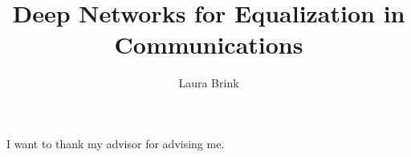 \documentclass[masters]{ucbthesis}
\begin{document}

\title{Deep Networks for Equalization in Communications}
\author{Laura Brink}




\maketitle
\approvalpage
\copyrightpage



\begin{frontmatter}


\tableofcontents
\clearpage
\listoffigures
\clearpage
\listoftables

\begin{acknowledgements}
I want to thank my advisor for advising me.

\end{acknowledgements}

\end{frontmatter}

\pagestyle{headings}








\printbibliography
\end{document}
